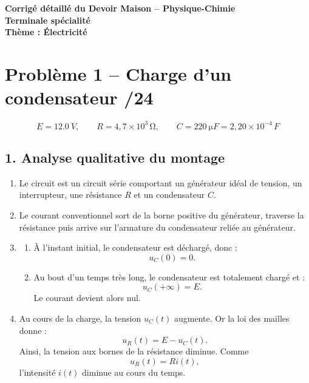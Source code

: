 \documentclass[11pt,a4paper]{article}
\begin{document}
\begin{center}
    {\LARGE \textbf{Corrigé détaillé du Devoir Maison -- Physique-Chimie}}\\[0.3em]
    {\Large \textbf{Terminale spécialité}}\\[0.5em]
    {\large \textbf{Thème : Électricité}}\\[0.8em]
\end{center}



\section*{Problème 1 -- Charge d'un condensateur \hfill /24}

\[
E=\SI{12.0}{V},\qquad R=4{,}7\times10^3\,\si{\ohm},\qquad C=\SI{220}{\micro F}=2{,}20\times10^{-4}\,\si{F}
\]

\subsection*{1. Analyse qualitative du montage}

\begin{enumerate}
    \item Le circuit est un circuit série comportant un générateur idéal de tension, un interrupteur, une résistance \(R\) et un condensateur \(C\).

    \item Le courant conventionnel sort de la borne positive du générateur, traverse la résistance puis arrive sur l'armature du condensateur reliée au générateur.

    \item 
    \begin{enumerate}[label=\alph*)]
        \item À l'instant initial, le condensateur est déchargé, donc :
        \[
        u_C(0)=0.
        \]
        \item Au bout d'un temps très long, le condensateur est totalement chargé et :
        \[
        u_C(+\infty)=E.
        \]
        Le courant devient alors nul.
    \end{enumerate}

    \item Au cours de la charge, la tension \(u_C(t)\) augmente. Or la loi des mailles donne :
    \[
    u_R(t)=E-u_C(t).
    \]
    Ainsi, la tension aux bornes de la résistance diminue. Comme
    \[
    u_R(t)=Ri(t),
    \]
    l'intensité \(i(t)\) diminue au cours du temps.
\end{enumerate}
\end{document}

